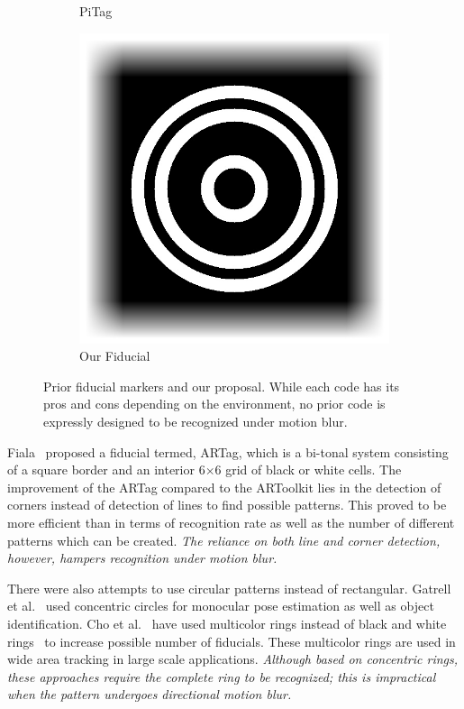 \documentclass[10pt,twocolumn,letterpaper]{article}
\begin{document}
\begin{figure}[b!]
\begin{subfigure}[b]{0.12\linewidth}
  PiTag\quad~\cite{Pitag13}
 \end{subfigure}\quad
 \begin{subfigure}[b]{0.14\linewidth}
  \centering
  \includegraphics[width=\linewidth]{images/our_fiducial}
  Our Fiducial
 \end{subfigure}
 \caption{Prior fiducial markers and our proposal.  While
 each code has its pros and cons depending on the environment, no
 prior code is expressly designed to be recognized under motion blur.}
 \label{fig:previous_work}
\end{figure}


Fiala~\cite{Fiala05} proposed a fiducial termed, ARTag, which is a
bi-tonal system consisting of a square border and an interior
6$\times$6 grid of black or white cells. The improvement of the ARTag
compared to the ARToolkit lies in the detection of corners instead of
detection of lines to find possible patterns.  This proved to be more
efficient than \cite{ARToolkit02} in terms of recognition rate as well
as the number of different patterns which can be created.  {\it The
reliance on both line and corner detection, however, hampers
recognition under motion blur.}

There were also attempts to use circular patterns instead of
rectangular.  Gatrell et al.~\cite{concentric} used concentric circles
for monocular pose estimation as well as object identification. Cho et
al.~\cite{Cho:2001,Cho97fastcolor} have used multicolor rings instead
of black and white rings~\cite{concentric} to increase possible number
of fiducials.  These multicolor rings are used in wide area tracking
in large scale applications.  {\it Although based on  concentric rings, these
approaches require the complete ring to be recognized; this is
impractical when the pattern undergoes directional motion blur.}
\end{document}
